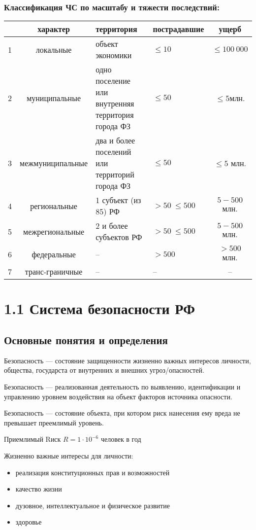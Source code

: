 \documentclass[oneside,final,14pt]{extreport}
\begin{document}
\subsection*{Классификация ЧС по масштабу и тяжести последствий:}
\begin{table}[h]
	\begin{tabular}{|r|c|p{}|p{}|c|}
		\hline \textnumero & характер & территория & пострадавшие & ущерб \\
		\hline 1 & локальные & объект экономики & $\le10$ & $\le100\ 000$ \\
		\hline 2 & муниципальные &одно поселение или внутренняя территория города ФЗ & $\le50$ & $\le5$млн. \\
		\hline 3 & межмуниципальные & два и более поселений или территорий города ФЗ & $\le50$ & $\le5$ млн. \\
		\hline 4 & региональные & 1 субъект (из 85) РФ & $>50\ \le500$ & $5-500$ млн. \\
		\hline 5 & межрегиональные & 2 и более субъектов РФ & $>50\ \le500$ & $5-500$ млн. \\
		\hline 6 & федеральные & -- & $>500$ & $>500$ млн. \\
		\hline 7 & транс-граничные & -- & -- & -- \\
		\hline
	\end{tabular}
\end{table}


\chapter*{1.1 Система безопасности РФ}
\section*{Основные понятия и определения}

Безопасность --- состояние защищенности жизненно важных интересов личности, общества, государста от внутренних и внешних угроз/опасностей.

Безопасность --- реализованная деятельность по выявлению, идентификации и управлению уровнем воздействия на объект факторов источника опасности.

Безопасность --- состояние объекта, при котором риск нанесения ему вреда не превышает преемлимый уровень.

Приемлимый Rиск $R=1\cdot 10^{-6}$ человек в год

Жизненно важные интересы для личности:
\begin{itemize}
	\item реализация конституционных прав и возможностей
	\item качество жизни
	\item дузовное, интеллектуальное и физическое развитие
	\item здоровье
\end{itemize}
\end{document}
